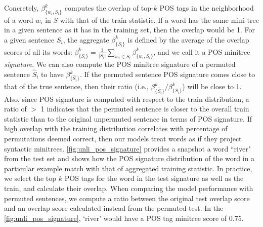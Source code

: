 \documentclass[letterpaper, 12pt]{report}
\begin{document}
Concretely, $\beta^k_{\{w_i,S_i\}}$ computes the overlap of top-$k$ POS tags in the neighborhood of a word $w_i$ in $S$ with that of the train statistic. If a word has the same mini-tree in a given sentence as it has in the training set, then the overlap would be 1. For a given sentence $S_i$, the aggregate $\beta^k_{\{S_i\}}$ is defined by the average of the overlap scores of all its words: $\beta^k_{\{S_i\}} = \frac{1}{|S_i|}\sum_{w_i \in S_i} \beta^k_{\{w_i,S_i\}}$, and we call it a POS minitree \textit{signature}. We can also compute the POS minitree signature of a permuted sentence $\hat{S}_i$ to have $\beta^k_{\{\hat{S}_i\}}$.  If the permuted sentence POS signature comes close to that of the true sentence, then their ratio (i.e.,  $\beta^k_{\{\hat{S}_i\}} / \beta^k_{\{S_i\}}$) will be close to 1. Also, since POS signature is computed with respect to the train distribution, a ratio of $>$ 1 indicates that the permuted sentence is closer to the overall train statistic than to the original unpermuted sentence in terms of POS signature. %
If high overlap with the training distribution correlates with percentage of permutations deemed correct, then our models treat words as if they project syntactic minitrees.
\autoref{fig:unli_pos_signature} provides a snapshot a word ``river" from the test set and shows how the POS signature distribution of the word in a particular example match with that of aggregated training statistic. In practice, we select the top $k$ POS tags for the word in the test signature as well as the train, and calculate their overlap. When comparing the model performance with permuted sentences, we compute a ratio between the original test overlap score and an overlap score calculated instead from the permuted test. In the \autoref{fig:unli_pos_signature}, `river' would have a POS tag minitree score of 0.75.
\end{document}
